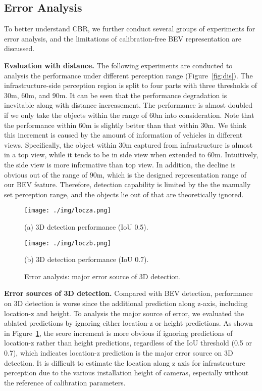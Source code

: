 \documentclass[letterpaper, 10 pt, conference]{ieeeconf}
\begin{document}
\subsection{Error Analysis}

To better understand CBR, we further conduct several groups of experiments for error analysis, and the limitations of calibration-free BEV representation are discussed.

\textbf{Evaluation with distance.}
The following experiments are conducted to analysis the performance under different perception range (Figure~\ref{fig:dis}). The infrastructure-side perception region is split to four parts with three thresholds of 30m, 60m, and 90m. It can be seen that the performance degradation is inevitable along with distance increasement. The performance is almost doubled if we only take the objects within the range of 60m into consideration. Note that the performance within 60m is slightly better than that within 30m. We think this increment is caused by the amount of information of vehicles in different views. Specifically, the object within 30m captured from infrastructure is almost in a top view, while it tends to be in side view when extended to 60m. Intuitively, the side view is more informative than top view. 
In addition, the decline is obvious out of the range of 90m, which is the designed representation range of our BEV feature. Therefore, detection capability is limited by the the manually set perception range, and the objects lie out of that are theoretically ignored.

\begin{figure}
\footnotesize
\begin{minipage}[b]{1.0\linewidth}
  \centering
  \centerline{\texttt{[image: ./img/locza.png]}}
  \centerline{(a) 3D detection performance (IoU 0.5).}\medskip
\end{minipage}
 \vspace{1pt}
\begin{minipage}[b]{1.0\linewidth}
  \centering
  \centerline{\texttt{[image: ./img/loczb.png]}}
  \centerline{(b) 3D detection performance (IoU 0.7).}\medskip
\end{minipage}

\caption{Error analysis: major error source of 3D detection.}
\label{fig:source}
\end{figure}

\textbf{Error sources of 3D detection.}
Compared with BEV detection, performance on 3D detection is worse since the additional prediction along z-axis, including location-z and height. To analysis the major source of error, we evaluated the ablated predictions by ignoring either location-z or height predictions. As shown in Figure~\ref{fig:source}, the score increment is more obvious if ignoring predictions of location-z rather than height predictions, regardless of the IoU threshold (0.5 or 0.7), which indicates location-z prediction is the major error source on 3D detection. It is difficult to estimate the location along z axis for infrastructure perception due to the various installation height of cameras, especially without the reference of calibration parameters.
\end{document}
